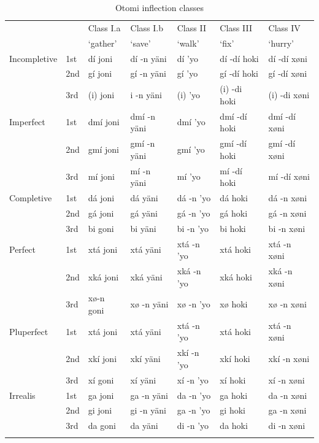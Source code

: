 \begin{table}
    \centering
    \footnotesize
  \begin{tabular}{lllllll}
    \lsptoprule
                 &     & Class I.a & Class I.b       & Class II     & Class III      & Class IV      \\
                 &     & `gather'  & `save'          & `walk'       & `fix'          & `hurry'       \\
    \midrule
    Incompletive & 1st & dí joni   & dí -n yäni      & dí 	’yo & dí -dí hoki    & dí -dí xøni   \\
                 & 2nd & gí joni   & gí -n yäni      & gí 	’yo & gí -dí hoki    & gí -dí xøni   \\
                 & 3rd & (i) joni  & i -n yäni       & (i) 	’yo & (i) -di hoki   & (i) -di xøni  \\
    \midrule
    Imperfect    & 1st & dmí joni  & dmí -n yäni     & dmí 	’yo & dmí -dí hoki   & dmí -dí xøni  \\
                 & 2nd & gmí joni  & gmí -n yäni     & gmí 	’yo & gmí -dí hoki   & gmí -dí xøni  \\
                 & 3rd & mí joni   & mí -n yäni      & mí 	’yo & mí -dí hoki    & mí -dí xøni   \\
    \midrule
    Completive   & 1st & dá joni   & dá 	yäni & dá -n ’yo    & dá 	hoki & dá -n xøni    \\
                 & 2nd & gá joni   & gá 	yäni & gá -n ’yo    & gá 	hoki & gá -n xøni    \\
                 & 3rd & bi goni   & bi 	yäni & bi -n ’yo    & bi 	hoki & bi -n xøni    \\
    \midrule
    Perfect      & 1st & xtá joni  & xtá 	yäni & xtá -n ’yo   & xtá 	hoki & xtá -n xøni   \\
                 & 2nd & xká joni  & xká 	yäni & xká -n ’yo   & xká 	hoki & xká -n xøni   \\
                 & 3rd & xø-n goni & xø -n yäni      & xø -n ’yo    & xø 	hoki & xø -n xøni    \\
    \midrule
    Pluperfect   & 1st & xtá joni  & xtá 	yäni & xtá -n ’yo   & xtá 	hoki & xtá -n xøni   \\
                 & 2nd & xkí joni  & xkí 	yäni & xkí -n ’yo   & xkí 	hoki & xkí -n xøni   \\
                 & 3rd & xí goni   & xí 	yäni & xí -n ’yo    & xí 	hoki & xí -n xøni    \\
    \midrule
    Irrealis     & 1st & ga joni   & ga -n yäni      & da -n ’yo    & ga 	hoki & da -n xøni    \\
                 & 2nd & gi joni   & gi -n yäni      & ga -n ’yo    & gi 	hoki & ga -n xøni    \\
                 & 3rd & da goni   & da 	yäni & di -n ’yo    & da 	hoki & di -n 	xøni \\
    \lspbottomrule
  \end{tabular}
  \caption{Otomi inflection classes}\label{tab:class-otomi}
\end{table}

